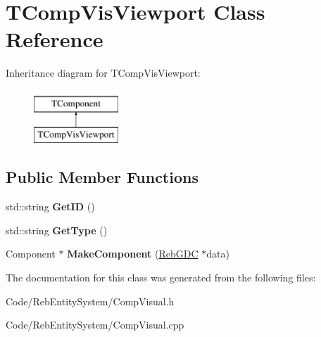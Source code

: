 \hypertarget{class_t_comp_vis_viewport}{}\section{T\+Comp\+Vis\+Viewport Class Reference}
\label{class_t_comp_vis_viewport}
Inheritance diagram for T\+Comp\+Vis\+Viewport\+:\begin{figure}[H]
\begin{center}
\leavevmode
\includegraphics[height=2.000000cm]{class_t_comp_vis_viewport}
\end{center}
\end{figure}
\subsection*{Public Member Functions}
\begin{DoxyCompactItemize}
\item 
std\+::string {\bfseries Get\+ID} ()\hypertarget{class_t_comp_vis_viewport_aa61098f9f21a9099ff5ab8799032b5e9}{}\label{class_t_comp_vis_viewport_aa61098f9f21a9099ff5ab8799032b5e9}

\item 
std\+::string {\bfseries Get\+Type} ()\hypertarget{class_t_comp_vis_viewport_ad30e01b0491e3ebf0fd60fb329663005}{}\label{class_t_comp_vis_viewport_ad30e01b0491e3ebf0fd60fb329663005}

\item 
Component $\ast$ {\bfseries Make\+Component} (\hyperlink{class_reb_g_d_c}{Reb\+G\+DC} $\ast$data)\hypertarget{class_t_comp_vis_viewport_aabb7391c5b25c3b51b85011af0c8140e}{}\label{class_t_comp_vis_viewport_aabb7391c5b25c3b51b85011af0c8140e}

\end{DoxyCompactItemize}


The documentation for this class was generated from the following files\+:\begin{DoxyCompactItemize}
\item 
Code/\+Reb\+Entity\+System/Comp\+Visual.\+h\item 
Code/\+Reb\+Entity\+System/Comp\+Visual.\+cpp\end{DoxyCompactItemize}
